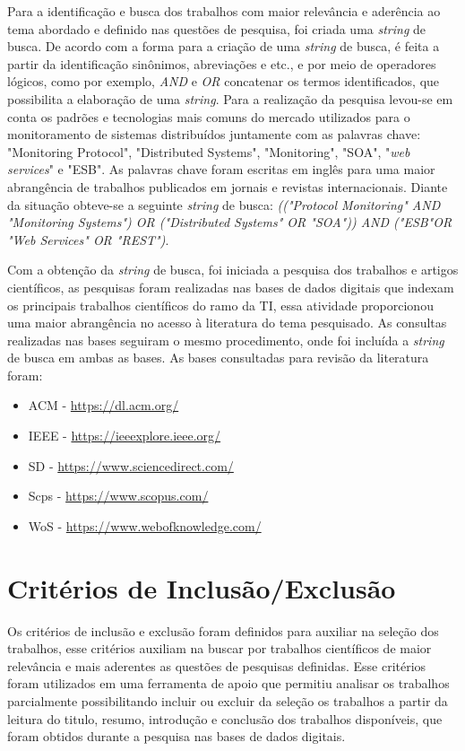 Para a identificação e busca dos trabalhos com maior relevância e aderência ao tema abordado e definido nas questões de pesquisa, foi criada uma \textit{string} de busca. De acordo com \cite{keele2007guidelines} a forma para a criação de uma \textit{string} de busca, é feita a partir da identificação sinônimos, abreviações e etc., e por meio de operadores lógicos, como por exemplo, \textit{AND} e \textit{OR}  concatenar os termos identificados, que possibilita a elaboração de uma \textit{string}. Para a realização da pesquisa levou-se em conta os padrões e tecnologias mais comuns do mercado utilizados para o monitoramento de sistemas distribuídos juntamente com as palavras chave: "Monitoring Protocol", "Distributed Systems", "Monitoring", "\acrshort{SOA}", "\textit{web services}" e "\acrshort{ESB}". As palavras chave foram escritas em inglês para uma maior abrangência de trabalhos publicados em jornais e revistas internacionais. Diante da situação obteve-se a seguinte \textit{string} de busca: \textit{(("Protocol Monitoring" AND "Monitoring Systems") OR ("Distributed Systems" OR "SOA")) AND ("ESB"OR "Web Services" OR "REST")}.

Com a obtenção da \textit{string} de busca, foi iniciada a pesquisa dos trabalhos e artigos científicos, as pesquisas foram realizadas nas bases de dados digitais que indexam os principais trabalhos científicos do ramo da \acrlong{TI}, essa atividade proporcionou uma maior abrangência no acesso à literatura do tema pesquisado\cite{kitchenham2007guidelines}. As consultas realizadas nas bases seguiram o mesmo procedimento, onde foi incluída a \textit{string} de busca em ambas as bases. As bases consultadas para revisão da literatura foram:
\begin{itemize}
\item \acrlong{ACM} - \url{https://dl.acm.org/}
\item \acrlong{IEEE} - \url{https://ieeexplore.ieee.org/}
\item \acrlong{SD} - \url{https://www.sciencedirect.com/}
\item \acrlong{Scps} - \url{https://www.scopus.com/}
\item \acrlong{WoS} - \url{https://www.webofknowledge.com/}
\end{itemize}


\section{Critérios de Inclusão/Exclusão}
Os critérios de inclusão e exclusão foram definidos para auxiliar na seleção dos trabalhos, esse critérios auxiliam na buscar por trabalhos científicos de maior relevância e mais aderentes as questões de pesquisas definidas. Esse critérios foram utilizados em uma ferramenta de apoio que permitiu analisar os trabalhos parcialmente possibilitando incluir ou excluir da seleção os trabalhos a partir da leitura do titulo, resumo, introdução e conclusão dos trabalhos disponíveis, que foram obtidos durante a pesquisa nas bases de dados digitais.    

